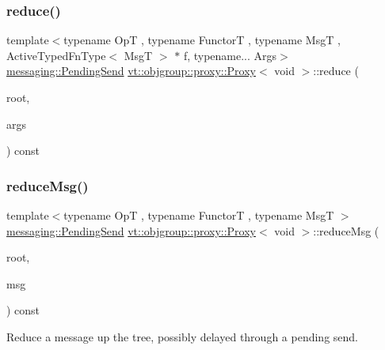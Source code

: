 \subsubsection{\texorpdfstring{reduce()}{reduce()}\hspace{0.1cm}{\footnotesize\ttfamily [2/2]}}
{\footnotesize\ttfamily template$<$typename OpT , typename FunctorT , typename MsgT , Active\+Typed\+Fn\+Type$<$ Msg\+T $>$ $\ast$ f, typename... Args$>$ \\
\hyperlink{structvt_1_1messaging_1_1_pending_send}{messaging\+::\+Pending\+Send} \hyperlink{structvt_1_1objgroup_1_1proxy_1_1_proxy}{vt\+::objgroup\+::proxy\+::\+Proxy}$<$ void $>$\+::reduce (\begin{DoxyParamCaption}\item[{\hyperlink{namespacevt_a866da9d0efc19c0a1ce79e9e492f47e2}{Node\+Type}}]{root,  }\item[{Args \&\&...}]{args }\end{DoxyParamCaption}) const}

\mbox{\label{structvt_1_1objgroup_1_1proxy_1_1_proxy_3_01void_01_4_a545aeca8f6c0250221796b2138a4583d}} 
\subsubsection{\texorpdfstring{reduce\+Msg()}{reduceMsg()}\hspace{0.1cm}{\footnotesize\ttfamily [1/2]}}
{\footnotesize\ttfamily template$<$typename OpT , typename FunctorT , typename MsgT $>$ \\
\hyperlink{structvt_1_1messaging_1_1_pending_send}{messaging\+::\+Pending\+Send} \hyperlink{structvt_1_1objgroup_1_1proxy_1_1_proxy}{vt\+::objgroup\+::proxy\+::\+Proxy}$<$ void $>$\+::reduce\+Msg (\begin{DoxyParamCaption}\item[{\hyperlink{namespacevt_a866da9d0efc19c0a1ce79e9e492f47e2}{Node\+Type}}]{root,  }\item[{MsgT $\ast$const}]{msg }\end{DoxyParamCaption}) const}



Reduce a message up the tree, possibly delayed through a pending send. 


